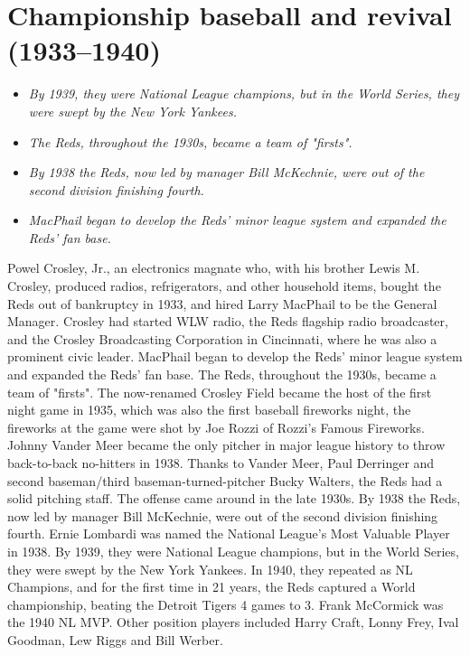 \section{Championship baseball and revival
(1933--1940)}\label{championship-baseball-and-revival-19331940}

\begin{itemize}
\item
  \emph{By 1939, they were National League champions, but in the World
  Series, they were swept by the New York Yankees.}
\item
  \emph{The Reds, throughout the 1930s, became a team of "firsts".}
\item
  \emph{By 1938 the Reds, now led by manager Bill McKechnie, were out of
  the second division finishing fourth.}
\item
  \emph{MacPhail began to develop the Reds' minor league system and
  expanded the Reds' fan base.}
\end{itemize}

Powel Crosley, Jr., an electronics magnate who, with his brother Lewis
M. Crosley, produced radios, refrigerators, and other household items,
bought the Reds out of bankruptcy in 1933, and hired Larry MacPhail to
be the General Manager. Crosley had started WLW radio, the Reds flagship
radio broadcaster, and the Crosley Broadcasting Corporation in
Cincinnati, where he was also a prominent civic leader. MacPhail began
to develop the Reds' minor league system and expanded the Reds' fan
base. The Reds, throughout the 1930s, became a team of "firsts". The
now-renamed Crosley Field became the host of the first night game in
1935, which was also the first baseball fireworks night, the fireworks
at the game were shot by Joe Rozzi of Rozzi's Famous Fireworks. Johnny
Vander Meer became the only pitcher in major league history to throw
back-to-back no-hitters in 1938. Thanks to Vander Meer, Paul Derringer
and second baseman/third baseman-turned-pitcher Bucky Walters, the Reds
had a solid pitching staff. The offense came around in the late 1930s.
By 1938 the Reds, now led by manager Bill McKechnie, were out of the
second division finishing fourth. Ernie Lombardi was named the National
League's Most Valuable Player in 1938. By 1939, they were National
League champions, but in the World Series, they were swept by the New
York Yankees. In 1940, they repeated as NL Champions, and for the first
time in 21 years, the Reds captured a World championship, beating the
Detroit Tigers 4 games to 3. Frank McCormick was the 1940 NL MVP. Other
position players included Harry Craft, Lonny Frey, Ival Goodman, Lew
Riggs and Bill Werber.

